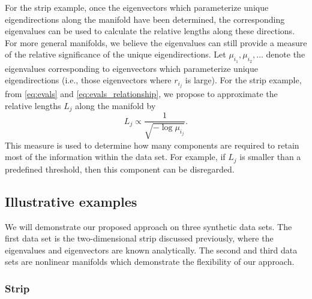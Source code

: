 \documentclass[preprint]{elsarticle}
\begin{document}
For the strip example, once the eigenvectors which parameterize unique eigendirections along the manifold have been determined, the corresponding eigenvalues can be used to calculate the relative lengths along these directions. 
%
For more general manifolds, we believe the eigenvalues can still provide a measure of the relative significance of the unique eigendirections.
%
Let $\mu_{i_1}, \mu_{i_2}, \dots$ denote the eigenvalues corresponding to eigenvectors which parameterize unique eigendirections (i.e., those eigenvectors where $r_{i_j}$ is large). 
%
For the strip example, from \eqref{eq:evals} and \eqref{eq:evals_relationship}, we propose to approximate the relative lengths $L_j$  along the manifold by
\begin{equation} \label{eq:est_lengths}
L_j \propto \frac{1}{\sqrt{-\log \mu_{i_j}}}.
\end{equation}
%
This measure is used to determine how many components are required to retain most of the information within the data set.
%
For example, if $L_j$ is smaller than a predefined threshold, then this component can be disregarded. 


\subsection{Illustrative examples} \label{sec:illustrative_examples}

We will demonstrate our proposed approach on three synthetic data sets. 
%
The first data set is the two-dimensional strip discussed previously, where the eigenvalues and eigenvectors are known analytically.
%
The second and third data sets are nonlinear manifolds which demonstrate the flexibility of our approach. 

\subsubsection{Strip}
\end{document}
